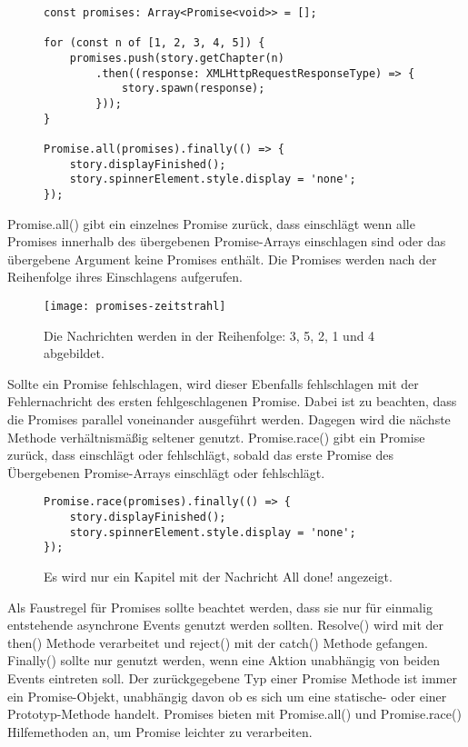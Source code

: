 \begin{figure}[H]
\begin{lstlisting}
const promises: Array<Promise<void>> = [];

for (const n of [1, 2, 3, 4, 5]) {
    promises.push(story.getChapter(n)
        .then((response: XMLHttpRequestResponseType) => {
            story.spawn(response);
        }));
}

Promise.all(promises).finally(() => {
    story.displayFinished();
    story.spinnerElement.style.display = 'none';
});
\end{lstlisting}
\end{figure}

\noindent
Promise.all() gibt ein einzelnes Promise zurück, dass einschlägt wenn alle Promises innerhalb des übergebenen Promise-Arrays einschlagen sind oder das übergebene Argument keine Promises enthält. Die Promises werden nach der Reihenfolge ihres Einschlagens aufgerufen.

\begin{figure}[H]
\centering
\texttt{[image: promises-zeitstrahl]}
\caption{Die Nachrichten werden in der Reihenfolge: 3, 5, 2, 1 und 4 abgebildet.}
\end{figure}

\noindent
Sollte ein Promise fehlschlagen, wird dieser Ebenfalls fehlschlagen mit der Fehlernachricht des ersten fehlgeschlagenen Promise.\cite{promise-executor} Dabei ist zu beachten, dass die Promises parallel voneinander ausgeführt werden. Dagegen wird die nächste Methode verhältnismäßig seltener genutzt. Promise.race() gibt ein Promise zurück, dass einschlägt oder fehlschlägt, sobald das erste Promise des Übergebenen Promise-Arrays einschlägt oder fehlschlägt.\cite{versprechen}

\begin{figure}[H]
\begin{lstlisting}
Promise.race(promises).finally(() => {
    story.displayFinished();
    story.spinnerElement.style.display = 'none';
});
\end{lstlisting}
\caption{Es wird nur ein Kapitel mit der Nachricht \glqq All done!\grqq{} angezeigt.}
\end{figure}

 \noindent
 Als Faustregel für Promises sollte beachtet werden, dass sie nur für einmalig entstehende asynchrone Events genutzt werden sollten. Resolve() wird mit der then() Methode verarbeitet und reject() mit der catch() Methode gefangen. Finally() sollte nur genutzt werden, wenn eine Aktion unabhängig von beiden Events eintreten soll. Der zurückgegebene Typ einer Promise Methode ist immer ein Promise-Objekt, unabhängig davon ob es sich um eine statische- oder einer Prototyp-Methode handelt. Promises bieten mit Promise.all() und Promise.race() Hilfemethoden an, um Promise leichter zu verarbeiten.

